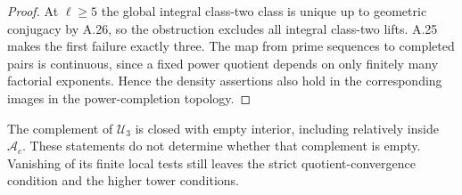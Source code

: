 \begin{proof}
At $\ell\geq5$ the global integral class-two
class is unique up to geometric conjugacy
by A.26, so the obstruction excludes all
integral class-two lifts. A.25 makes the
first failure exactly three.
The map from prime sequences to completed
pairs is continuous, since a fixed power
quotient depends on only finitely many
factorial exponents. Hence the density
assertions also hold in the corresponding
images in the power-completion topology.
\end{proof}

The complement of $\mathscr U_3$ is closed
with empty interior, including relatively
inside $\mathscr A_c$. These statements do
not determine whether that complement is
empty. Vanishing of its finite local tests
still leaves the strict quotient-convergence
condition and the higher tower conditions.

